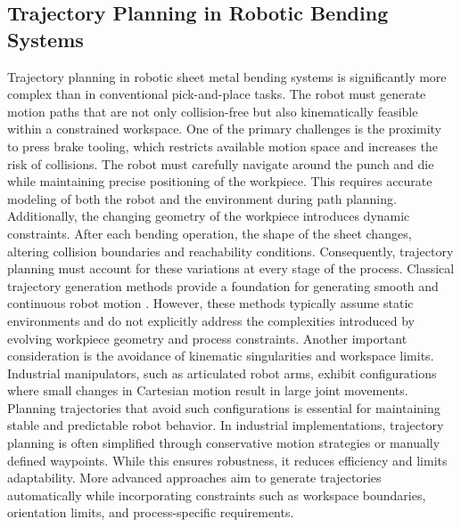 \subsection{Trajectory Planning in Robotic Bending Systems}
Trajectory planning in robotic sheet metal bending systems is significantly more complex than in conventional pick-and-place tasks. The robot must generate motion paths that are not only collision-free but also kinematically feasible within a constrained workspace.
One of the primary challenges is the proximity to press brake tooling, which restricts available motion space and increases the risk of collisions. The robot must carefully navigate around the punch and die while maintaining precise positioning of the workpiece. This requires accurate modeling of both the robot and the environment during path planning.
Additionally, the changing geometry of the workpiece introduces dynamic constraints. After each bending operation, the shape of the sheet changes, altering collision boundaries and reachability conditions. Consequently, trajectory planning must account for these variations at every stage of the process.
Classical trajectory generation methods provide a foundation for generating smooth and continuous robot motion \cite{Biagiotti2008Trajectory}. However, these methods typically assume static environments and do not explicitly address the complexities introduced by evolving workpiece geometry and process constraints.
Another important consideration is the avoidance of kinematic singularities and workspace limits. Industrial manipulators, such as articulated robot arms, exhibit configurations where small changes in Cartesian motion result in large joint movements. Planning trajectories that avoid such configurations is essential for maintaining stable and predictable robot behavior.
In industrial implementations, trajectory planning is often simplified through conservative motion strategies or manually defined waypoints. While this ensures robustness, it reduces efficiency and limits adaptability. More advanced approaches aim to generate trajectories automatically while incorporating constraints such as workspace boundaries, orientation limits, and process-specific requirements.

